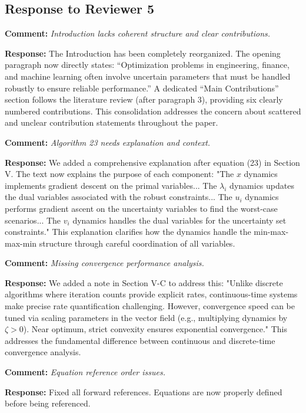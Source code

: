 \documentclass[journal,twoside,web]{ieeecolor}
\begin{document}
\subsection*{Response to Reviewer 5}

\textbf{Comment:} \textit{Introduction lacks coherent structure and clear contributions.}

\textbf{Response:} The Introduction has been completely reorganized. The opening paragraph now directly states: ``Optimization problems in engineering, finance, and machine learning often involve uncertain parameters that must be handled robustly to ensure reliable performance.'' A dedicated ``Main Contributions'' section follows the literature review (after paragraph 3), providing six clearly numbered contributions. This consolidation addresses the concern about scattered and unclear contribution statements throughout the paper.

\textbf{Comment:} \textit{Algorithm 23 needs explanation and context.}

\textbf{Response:} We added a comprehensive explanation after equation (23) in Section V. The text now explains the purpose of each component: "The $x$ dynamics implements gradient descent on the primal variables... The $\lambda_i$ dynamics updates the dual variables associated with the robust constraints... The $u_i$ dynamics performs gradient ascent on the uncertainty variables to find the worst-case scenarios... The $v_i$ dynamics handles the dual variables for the uncertainty set constraints." This explanation clarifies how the dynamics handle the min-max-max-min structure through careful coordination of all variables.

\textbf{Comment:} \textit{Missing convergence performance analysis.}

\textbf{Response:} We added a note in Section V-C to address this: "Unlike discrete algorithms where iteration counts provide explicit rates, continuous-time systems make precise rate quantification challenging. However, convergence speed can be tuned via scaling parameters in the vector field (e.g., multiplying dynamics by $\zeta > 0$). Near optimum, strict convexity ensures exponential convergence." This addresses the fundamental difference between continuous and discrete-time convergence analysis.

\textbf{Comment:} \textit{Equation reference order issues.}

\textbf{Response:} Fixed all forward references. Equations are now properly defined before being referenced.
\end{document}
